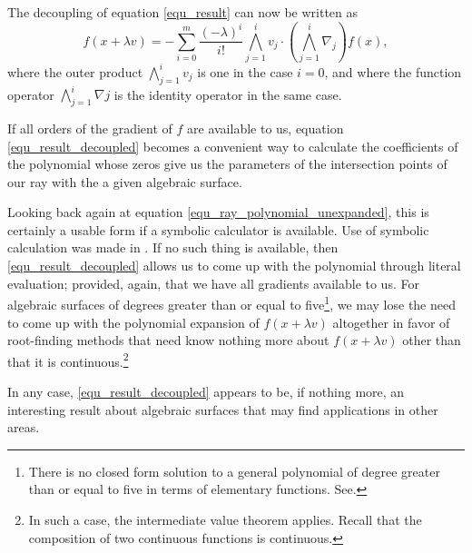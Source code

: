 \documentclass{birkjour}
\theoremstyle{definition}
\theoremstyle{remark}
\numberwithin{equation}{section}
\begin{document}
The decoupling of equation \eqref{equ_result} can now be written as
\begin{equation}\label{equ_result_decoupled}
f(x+\lambda v) = -\sum_{i=0}^m\frac{(-\lambda)^i}{i!}\bigwedge_{j=1}^i v_j\cdot\left(\bigwedge_{j=1}^i\nabla_j\right)f(x),
\end{equation}
where the outer product $\bigwedge_{j=1}^i v_j$ is one in the case $i=0$, and where the function
operator $\bigwedge_{j=1}^i\nabla j$ is the identity operator in the same case.

If all orders of the gradient of $f$ are available to us, equation \eqref{equ_result_decoupled} becomes
a convenient way to calculate the coefficients of the polynomial whose zeros give us the parameters of
the intersection points of our ray with the a given algebraic surface.

Looking back again at equation \eqref{equ_ray_polynomial_unexpanded}, this is certainly a usable form
if a symbolic calculator is available.  Use of symbolic calculation was made in \cite{Hanrahan83}.  If no such
thing is available, then \eqref{equ_result_decoupled} allows us to come up with the polynomial
through literal evaluation; provided, again, that we have all gradients available to us.
For algebraic surfaces of degrees greater than or equal to five\footnote{There is no closed form solution
to a general polynomial of degree greater than or equal to five in terms of elementary functions.  See\cite{}.}, we may
lose the need to come up
with the polynomial expansion of $f(x+\lambda v)$ altogether in favor of root-finding methods
that need know nothing more about $f(x+\lambda v)$ other than that it is continuous.\footnote{In such a
case, the intermediate value theorem applies.  Recall that the composition of two continuous functions
is continuous.}

In any case, \eqref{equ_result_decoupled} appears to be, if nothing more, an
interesting result about algebraic surfaces that may find applications in other areas.




\end{document}
